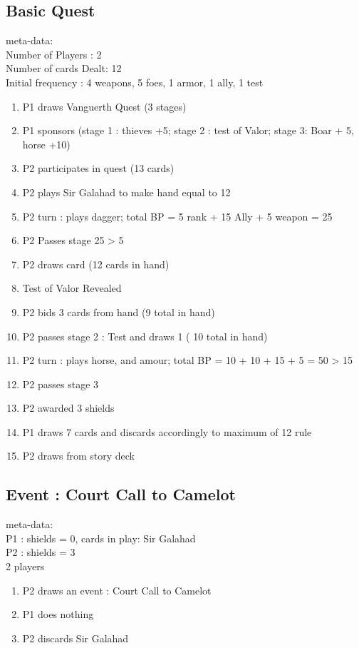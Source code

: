 \documentclass[a4paper,11pt]{article}
\begin{document}
\subsection{Basic Quest}
meta-data:\\
Number of Players : 2\\
Number of cards Dealt: 12\\
Initial frequency : 4 weapons, 5 foes, 1 armor, 1 ally, 1 test\\
\begin{enumerate}
	\item P1 draws Vanguerth Quest (3 stages)
	\item P1 sponsors (stage 1 : thieves +5; stage 2 : test of Valor; stage 3: Boar + 5, horse +10)
	\item P2 participates in quest (13 cards)
	\item P2 plays Sir Galahad to make hand equal to 12
	\item P2 turn : plays dagger; total BP =  5 rank + 15 Ally + 5 weapon = 25
	\item P2 Passes stage 25 > 5
	\item P2 draws card (12 cards in hand)
	\item Test of Valor Revealed 
	\item P2 bids 3 cards from hand (9 total in hand)
	\item P2 passes stage 2 : Test and draws 1 ( 10 total in hand)
	\item P2 turn : plays horse, and amour; total BP = 10 + 10 + 15 + 5 = 50 > 15
	\item P2 passes stage 3
	\item P2 awarded 3 shields
	\item P1 draws 7 cards and discards accordingly to  maximum of 12 rule
	\item P2 draws from story deck
\end{enumerate}

\subsection{Event : Court Call to Camelot}
meta-data:\\
P1 : shields = 0, cards in play: Sir Galahad\\
P2 : shields = 3\\
2 players\\
\begin{enumerate}
	\item P2 draws an event : Court Call to Camelot
	\item P1 does nothing
	\item P2 discards Sir Galahad
\end{enumerate}
\end{document}
